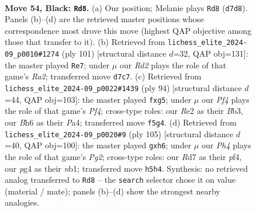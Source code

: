\documentclass[11pt]{article}
\begin{document}
\clearpage

\begin{figure}[p]\centering
\begin{subfigure}{0.46\textwidth}\centering
\resizebox{\linewidth}{!}{%
\newchessgame
\chessboard[
  setfen={8/1p1r3k/5Kpb/5p1p/P5P1/7P/4r3/8 b - - 0 54},
  showmover=false,
  pgfstyle=straightmove, color=movearrow, markmove={d7-d8}
]}
\caption{}
\end{subfigure}\hfill
\begin{subfigure}{0.46\textwidth}\centering
\resizebox{\linewidth}{!}{%
\newchessgame
\chessboard[
  setfen={8/r4k1p/6pP/3p1p2/2b1PK2/5P2/8/8 b - - 0 51},
  showmover=false,
  pgfstyle=straightmove, color=movearrow, markmove={a7-e7}
]}
\caption{}
\end{subfigure}
\\[4pt]
\begin{subfigure}{0.46\textwidth}\centering
\resizebox{\linewidth}{!}{%
\newchessgame
\chessboard[
  setfen={8/2n5/1p1k3p/6p1/PK3P1P/1B4P1/8/8 w - - 0 48},
  showmover=false,
  pgfstyle=straightmove, color=movearrow, markmove={f4-g5}
]}
\caption{}
\end{subfigure}\hfill
\begin{subfigure}{0.46\textwidth}\centering
\resizebox{\linewidth}{!}{%
\newchessgame
\chessboard[
  setfen={8/6p1/5p1P/5P2/1bk2P2/2p5/1pK5/1N6 b - - 0 53},
  showmover=false,
  pgfstyle=straightmove, color=movearrow, markmove={g7-h6}
]}
\caption{}
\end{subfigure}
\caption{\textbf{Move 54, Black: \texttt{Rd8}.} (a) Our position; Melanie plays \texttt{Rd8} (\texttt{d7d8}). Panels (b)--(d) are the retrieved master positions whose correspondence most drove this move (highest QAP objective among those that transfer to it). (b) Retrieved from \texttt{lichess\_elite\_2024-09\_p0010\#1274} (ply 101) [structural distance $d$=32, QAP obj=131]: the master played \texttt{Re7}; under $\mu$ our \emph{Rd2} plays the role of that game's \emph{Ra2}; transferred move \texttt{d7c7}. (c) Retrieved from \texttt{lichess\_elite\_2024-09\_p0022\#1439} (ply 94) [structural distance $d$=44, QAP obj=103]: the master played \texttt{fxg5}; under $\mu$ our \emph{Pf4} plays the role of that game's \emph{Pf4}; cross-type roles: our \emph{R}e2 as their \emph{B}b3, our \emph{B}h6 as their \emph{P}a4; transferred move \texttt{f5g4}. (d) Retrieved from \texttt{lichess\_elite\_2024-09\_p0020\#9} (ply 105) [structural distance $d$=40, QAP obj=100]: the master played \texttt{gxh6}; under $\mu$ our \emph{Ph4} plays the role of that game's \emph{Pg2}; cross-type roles: our \emph{R}d7 as their \emph{p}f4, our \emph{p}g4 as their \emph{n}b1; transferred move \texttt{h5h4}. Synthesis: no retrieved analog transferred to \texttt{Rd8} -- the \texttt{search} selector chose it on value (material / mate); panels (b)--(d) show the strongest nearby analogies.}
\label{fig:thought-m107}
\end{figure}
\end{document}
